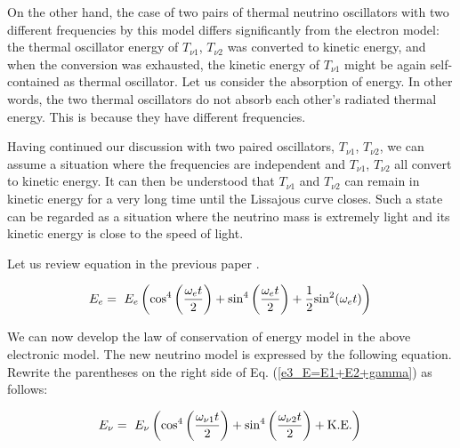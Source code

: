 \documentclass[%
 reprint,
 amsmath,amssymb,
 aps,
]{revtex4-1}
\numberwithin{equation}{section}%
\begin{document}
On the other hand, the case of two pairs of thermal neutrino oscillators with two different frequencies by this model differs significantly from the electron model: the thermal oscillator energy of $T_{\nu \mathrm{1}}$, $T_{\nu \mathrm{2}}$ was converted to kinetic energy, and when the conversion was exhausted, the kinetic energy of $T_{\nu \mathrm{1}}$ might be again self-contained as thermal oscillator. Let us consider the absorption of energy. In other words, the two thermal oscillators do not absorb each other's radiated thermal energy. This is because they have different frequencies.

Having continued our discussion with two paired oscillators, $T_{\nu \mathrm{1}}$, $T_{\nu \mathrm{2}}$, we can assume a situation where the frequencies are independent and $T_{\nu \mathrm{1}}$, $T_{\nu \mathrm{2}}$ all convert to kinetic energy. It can then be understood that $T_{\nu \mathrm{1}}$ and $T_{\nu \mathrm{2}}$ can remain in kinetic energy for a very long time until the Lissajous curve closes. Such a state can be regarded as a situation where the neutrino mass is extremely light and its kinetic energy is close to the speed of light.


Let us review equation in the previous paper \cite{Hanamura1}. 

    \begin{equation}
        E_{e} = \ E_{e} \left( \mathrm{cos}^{4} \left( \frac{\omega_e t}{2} \right) + \mathrm{sin}^{4} \left( \frac{\omega_e t}{2} \right) + \frac{1}{2} \mathrm{sin}^{2} (\omega_e t) \right) \\
        \label{e3_E=E1+E2+gamma}
    \end{equation}


We can now develop the law of conservation of energy model in the above electronic model. The new neutrino model is expressed by the following equation. Rewrite the parentheses on the right side of Eq. (\ref{e3_E=E1+E2+gamma}) as follows:

    \begin{equation}
        E_{\nu} = \ E_{\nu} \left( \mathrm{cos}^{4} \left( \frac{\omega_{\nu 1} t}{2} \right) + \mathrm{sin}^{4} \left( \frac{\omega_{\nu 2} t}{2} \right) + \mathrm{K.E.} \right) \\
        \label{e3_N=N1+N2+KE}
    \end{equation}
\end{document}
